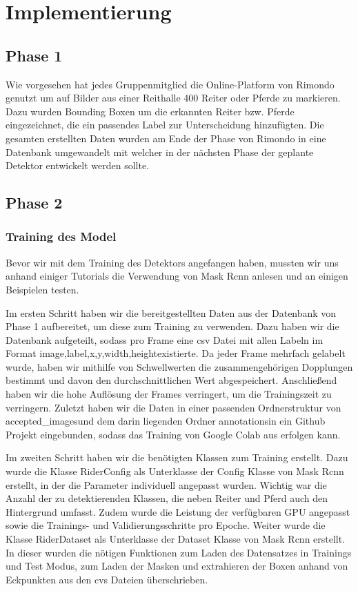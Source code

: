 \chapter{Implementierung}
\label{ch:implementierung}

\section{Phase 1}
Wie vorgesehen hat jedes Gruppenmitglied die Online-Platform von Rimondo genutzt um auf Bilder aus einer Reithalle 400 Reiter oder Pferde zu markieren. Dazu wurden Bounding Boxen um  die erkannten Reiter bzw. Pferde eingezeichnet, die ein passendes Label zur Unterscheidung hinzufügten. Die gesamten erstellten Daten wurden am Ende der Phase von Rimondo in eine Datenbank umgewandelt mit welcher in der nächsten Phase der geplante Detektor entwickelt werden sollte.

\section{Phase 2}
\subsection{Training des Model}
Bevor wir mit dem Training des Detektors angefangen haben, mussten wir uns anhand einiger Tutorials die Verwendung von Mask Rcnn anlesen und an einigen Beispielen testen. 

Im ersten Schritt haben wir die bereitgestellten Daten aus der Datenbank von Phase 1 aufbereitet, um diese zum Training zu verwenden. Dazu haben wir die Datenbank aufgeteilt, sodass pro Frame eine csv Datei mit allen Labeln im Format \dq image,label,x,y,width,height\dq existierte. Da jeder Frame mehrfach gelabelt wurde, haben wir mithilfe von Schwellwerten die zusammengehörigen Dopplungen bestimmt und davon den durchschnittlichen Wert abgespeichert. Anschließend haben wir die hohe Auflösung der Frames verringert, um die Trainingszeit zu verringern. Zuletzt haben wir die Daten in einer passenden Ordnerstruktur von \dq accepted_images\dq und dem darin liegenden Ordner \dq annotations\dq in ein Github Projekt eingebunden, sodass das Training von Google Colab aus erfolgen kann.

Im zweiten Schritt haben wir die benötigten Klassen zum Training erstellt. Dazu wurde die Klasse RiderConfig als Unterklasse der Config Klasse von Mask Rcnn erstellt, in der die Parameter individuell angepasst wurden. Wichtig war die Anzahl der zu detektierenden Klassen, die neben Reiter und Pferd auch den Hintergrund umfasst. Zudem wurde die Leistung der verfügbaren GPU angepasst sowie die Trainings- und Validierungsschritte pro Epoche. 
Weiter wurde die Klasse RiderDataset als Unterklasse der Dataset Klasse von Mask Rcnn erstellt. In dieser wurden die nötigen Funktionen zum Laden des Datensatzes in Trainings und Test Modus, zum Laden der Masken und extrahieren der Boxen anhand von Eckpunkten aus den cvs Dateien überschrieben.

